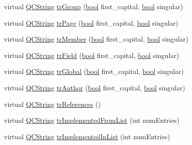 \begin{DoxyCompactItemize}
\item 
virtual \hyperlink{class_q_c_string}{Q\+C\+String} \hyperlink{class_translator_polish_a2a432d8fddb8ae68fe3f85d78bb06943}{tr\+Group} (\hyperlink{qglobal_8h_a1062901a7428fdd9c7f180f5e01ea056}{bool} first\+\_\+capital, \hyperlink{qglobal_8h_a1062901a7428fdd9c7f180f5e01ea056}{bool} singular)
\item 
virtual \hyperlink{class_q_c_string}{Q\+C\+String} \hyperlink{class_translator_polish_a7a2c4092e039a8154d249301433e65b0}{tr\+Page} (\hyperlink{qglobal_8h_a1062901a7428fdd9c7f180f5e01ea056}{bool} first\+\_\+capital, \hyperlink{qglobal_8h_a1062901a7428fdd9c7f180f5e01ea056}{bool} singular)
\item 
virtual \hyperlink{class_q_c_string}{Q\+C\+String} \hyperlink{class_translator_polish_a9f03af97f82667ea66b8b138426e420b}{tr\+Member} (\hyperlink{qglobal_8h_a1062901a7428fdd9c7f180f5e01ea056}{bool} first\+\_\+capital, \hyperlink{qglobal_8h_a1062901a7428fdd9c7f180f5e01ea056}{bool} singular)
\item 
virtual \hyperlink{class_q_c_string}{Q\+C\+String} \hyperlink{class_translator_polish_a6c534eb7b76b7bc38edc52275a5be426}{tr\+Field} (\hyperlink{qglobal_8h_a1062901a7428fdd9c7f180f5e01ea056}{bool} first\+\_\+capital, \hyperlink{qglobal_8h_a1062901a7428fdd9c7f180f5e01ea056}{bool} singular)
\item 
virtual \hyperlink{class_q_c_string}{Q\+C\+String} \hyperlink{class_translator_polish_a62f2f17d8585f65081cc9fd3f5091f4f}{tr\+Global} (\hyperlink{qglobal_8h_a1062901a7428fdd9c7f180f5e01ea056}{bool} first\+\_\+capital, \hyperlink{qglobal_8h_a1062901a7428fdd9c7f180f5e01ea056}{bool} singular)
\item 
virtual \hyperlink{class_q_c_string}{Q\+C\+String} \hyperlink{class_translator_polish_ad18ec9733cbb0c05a354fe60937f4fe4}{tr\+Author} (\hyperlink{qglobal_8h_a1062901a7428fdd9c7f180f5e01ea056}{bool} first\+\_\+capital, \hyperlink{qglobal_8h_a1062901a7428fdd9c7f180f5e01ea056}{bool} singular)
\item 
virtual \hyperlink{class_q_c_string}{Q\+C\+String} \hyperlink{class_translator_polish_ac65e96984474e5afde06e8df1dae5762}{tr\+References} ()
\item 
virtual \hyperlink{class_q_c_string}{Q\+C\+String} \hyperlink{class_translator_polish_aba87d564d05a4066850f11637dd37c05}{tr\+Implemented\+From\+List} (int num\+Entries)
\item 
virtual \hyperlink{class_q_c_string}{Q\+C\+String} \hyperlink{class_translator_polish_aabf2e141126f09588ba6eef99452ada0}{tr\+Implemented\+In\+List} (int num\+Entries)

\end{DoxyCompactItemize}
